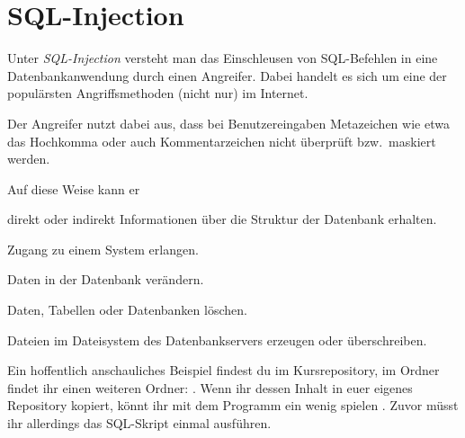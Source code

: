 \clearpage

\rehead[]{\textcolor{lightblue}{AvHG, Inf, My}}
\lohead[]{\textcolor{lightblue}{AvHG, Inf, My}}

\lstset{style=myJava}


\section{SQL-Injection}

Unter \emph{SQL-Injection} versteht man das Einschleusen von SQL-Befehlen
in eine Datenbankanwendung durch einen Angreifer. Dabei handelt es sich um eine
der populärsten Angriffsmethoden (nicht nur) im Internet.

Der Angreifer nutzt dabei aus, dass bei Benutzereingaben Metazeichen wie etwa
das Hochkomma oder auch Kommentarzeichen nicht überprüft bzw.\ maskiert werden.

Auf diese Weise kann er 

\begin{compactitem}
\item direkt oder indirekt Informationen über die Struktur der
Datenbank erhalten.
\item Zugang zu einem System erlangen.
\item Daten in der Datenbank verändern.
\item Daten, Tabellen oder Datenbanken löschen.
\item Dateien im Dateisystem des Datenbankservers erzeugen oder überschreiben.
\end{compactitem}

Ein hoffentlich anschauliches Beispiel findest du im Kursrepository, im Ordner
 findet ihr einen weiteren Ordner:
. Wenn ihr dessen Inhalt in euer eigenes Repository
kopiert, könnt ihr mit dem Programm  ein wenig \glqq spielen
\grqq . Zuvor müsst ihr allerdings das SQL-Skript 
einmal ausführen.

